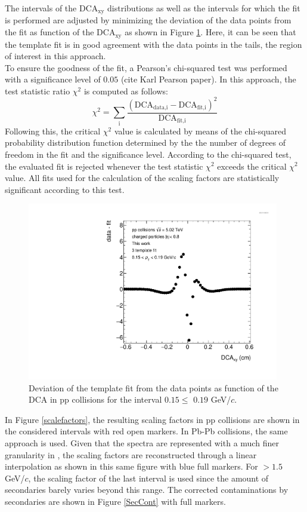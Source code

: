 \documentclass[12pt,a4paper]{report}
\begin{document}
The intervals of the DCA$_{\text{xy}}$ distributions as well as the \pt intervals for which the fit is performed are adjusted by minimizing the deviation of the data points from the fit as function of the DCA$_{\text{xy}}$ as shown in Figure \ref{Pulls}. Here, it can be seen that the template fit is in good agreement with the data points in the tails, the region of interest in this approach.\\
To ensure the goodness of the fit, a Pearson's chi-squared test was performed with a significance level of $0.05$ (cite Karl Pearson paper). In this approach, the test statistic ratio $\chi^2$ is computed as follows:
\begin{equation}
\chi^2 = \sum_{\text{i}} \dfrac{(\text{DCA}_\text{data,i} - \text{DCA}_\text{fit,i})^2}{\text{DCA}_\text{fit,i}}
\end{equation}
Following this, the critical $\chi^2$ value is calculated by means of the chi-squared probability distribution function determined by the the number of degrees of freedom in the fit and the significance level. According to the chi-squared test, the evaluated fit is rejected whenever the test statistic $\chi^2$ exceeds the critical $\chi^2$ value. All fits used for the calculation of the scaling factors are statistically significant according to this test. \\
\begin{figure}[tb!]
\centering
\includegraphics[width=11cm]{Plots/Pulls_Pt0_Mult0.pdf}  
\caption{Deviation of the template fit from the data points as function of the DCA in pp collisions for the \pt interval $0.15 \leq$ \pt $0.19$ GeV/$c$.}
\label{Pulls}
\end{figure}
\hspace{-0.6cm} In Figure \ref{scalefactors}, the resulting scaling factors in pp collisions are shown in the considered \pt intervals with red open markers. In Pb-Pb collisions, the same approach is used. Given that the \pt spectra are represented with a much finer granularity in \pt, the scaling factors are reconstructed through a linear interpolation as shown in this same figure with blue full markers. For \pt $> 1.5$ GeV/$c$, the scaling factor of the last \pt interval is used since the amount of secondaries barely varies beyond this range. The corrected contaminations by secondaries are shown in Figure \ref{SecCont} with full markers.
\end{document}
